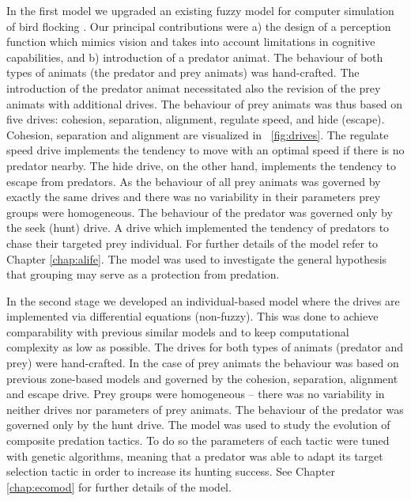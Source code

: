 In the first model we upgraded an existing fuzzy model for computer simulation of bird flocking \cite{lebarbajec2005fuzzy,lebarbajec2005simulating}. Our principal contributions were a) the design of a perception function which mimics vision and takes into account limitations in cognitive capabilities, and b) introduction of a predator animat. The behaviour of both types of animats (the predator and prey animats) was hand-crafted. The introduction of the predator animat necessitated also the revision of the prey animats with additional drives. The behaviour of prey animats was thus based on five drives: cohesion, separation, alignment, regulate speed, and hide (escape). Cohesion, separation and alignment are visualized in \figurename~\ref{fig:drives}. The regulate speed drive implements the tendency to move with an optimal speed if there is no predator nearby. The hide drive, on the other hand, implements the tendency to escape from predators. As the behaviour of all prey animats was governed by exactly the same drives and there was no variability in their parameters prey groups were homogeneous. The behaviour of the predator was governed only by the seek (hunt) drive. A drive which implemented the tendency of predators to chase their targeted prey individual. For further details of the model refer to Chapter \ref{chap:alife}. The model was used to investigate the general hypothesis that grouping may serve as a protection from predation.

In the second stage we developed an individual-based model where the drives are implemented via differential equations (non-fuzzy). This was done to achieve comparability with previous similar models and to keep computational complexity as low as possible. The drives for both types of animats (predator and prey) were hand-crafted. In the case of prey animats the behaviour was based on previous zone-based models \cite{aoki1982simulation,couzin2002collective} and governed by the cohesion, separation, alignment and escape drive. Prey groups were homogeneous -- there was no variability in neither drives nor parameters of prey animats. The behaviour of the predator was governed only by the hunt drive. The model was used to study the evolution of composite predation tactics. To do so the parameters of each tactic were tuned with genetic algorithms, meaning that a predator was able to adapt its target selection tactic in order to increase its hunting success. See Chapter \ref{chap:ecomod} for further details of the model. 

